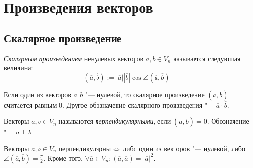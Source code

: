 \section{Произведения векторов}

\subsection{Скалярное произведение}

\begin{definition}
	\textit{Скалярным произведением} ненулевых векторов $\overline{a}, \overline{b} \in V_n$ называется следующая величина:
	\[(\overline{a}, \overline{b}) := |\overline{a}||\overline{b}|\cos{\angle(\overline{a}, \overline{b})}\]
	
	Если один из векторов $\overline{a}, \overline{b}$ "--- нулевой, то скалярное произведение $(\overline{a}, \overline{b})$ считается равным $0$. Другое обозначение скалярного произведения "--- $\overline a \cdot \overline{b}$.
\end{definition}

\begin{definition}
	Векторы $\overline{a}, \overline{b} \in V_n$ называются \textit{перпендикулярными}, если $(\overline{a}, \overline{b}) = 0$. Обозначение "--- $\overline a \perp \overline b$.
\end{definition}

\begin{note}
	Векторы $\overline a, \overline b \in V_n$ перпендикулярны $\Leftrightarrow$ либо один из векторов "--- нулевой, либо $\angle(\overline{a}, \overline{b}) = \frac\pi2$. Кроме того, $\forall \overline a \in V_n: (\overline{a},\overline{a}) = |\overline{a}|^2$.
\end{note}


